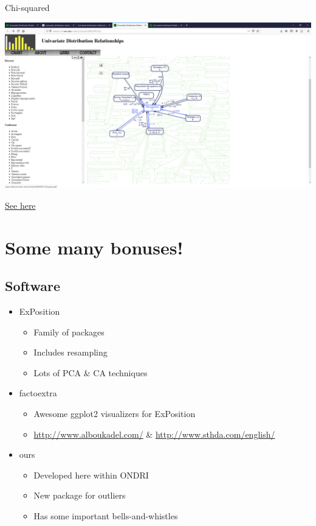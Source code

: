 \documentclass[
  ignorenonframetext,
]{beamer}
\providecommand{\tightlist}{%
  \setlength{\itemsep}{0pt}\setlength{\parskip}{0pt}}
\begin{document}
\begin{frame}{Chi-squared}
\protect\hypertarget{chi-squared-1}{}

\includegraphics{../images/Chi2.PNG}

\href{http://www.math.wm.edu/~leemis/chart/UDR/UDR.html}{See here}

\end{frame}

\hypertarget{some-many-bonuses}{%
\section{Some many bonuses!}\label{some-many-bonuses}}

\hypertarget{software}{%
\subsection{Software}\label{software}}

\begin{itemize}[<+->]
\tightlist
\item
  ExPosition

  \begin{itemize}[<+->]
  \tightlist
  \item
    Family of packages
  \item
    Includes resampling
  \item
    Lots of PCA \& CA techniques
  \end{itemize}
\item
  factoextra

  \begin{itemize}[<+->]
  \tightlist
  \item
    Awesome ggplot2 visualizers for ExPosition
  \item
    \url{http://www.alboukadel.com/} \&
    \url{http://www.sthda.com/english/}
  \end{itemize}
\item
  ours

  \begin{itemize}[<+->]
  \tightlist
  \item
    Developed here within ONDRI
  \item
    New package for outliers
  \item
    Has some important bells-and-whistles
  \end{itemize}
\end{itemize}
\end{document}
